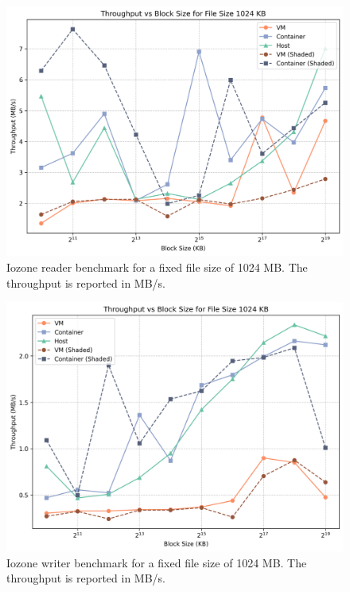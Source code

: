 \begin{figure}
    \centering
    \includegraphics[width=0.8\linewidth]{assets/reader_filesize_1024.png}
    \caption{Iozone reader benchmark for a fixed file size of 1024 MB. The throughput is reported in MB/s.}
    \label{fig:reader_filesize_1024}
\end{figure}

\begin{figure}
    \centering
    \includegraphics[width=0.8\linewidth]{assets/writer_filesize_1024.png}
    \caption{Iozone writer benchmark for a fixed file size of 1024 MB. The throughput is reported in MB/s.}
    \label{fig:writer_filesize_1024}
\end{figure}

